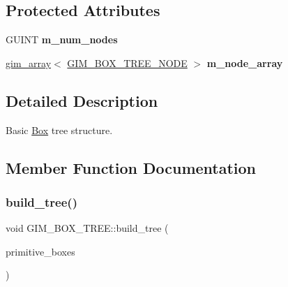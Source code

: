 \subsection*{Protected Attributes}
\begin{DoxyCompactItemize}
\item 
\mbox{\label{classGIM__BOX__TREE_ad175db1b709c3fd9835ce8423af847fd}} 
G\+U\+I\+NT {\bfseries m\+\_\+num\+\_\+nodes}
\item 
\mbox{\label{classGIM__BOX__TREE_aa84656941e890a11505d8c3cd3fc2f99}} 
\hyperlink{classgim__array}{gim\+\_\+array}$<$ \hyperlink{structGIM__BOX__TREE__NODE}{G\+I\+M\+\_\+\+B\+O\+X\+\_\+\+T\+R\+E\+E\+\_\+\+N\+O\+DE} $>$ {\bfseries m\+\_\+node\+\_\+array}
\end{DoxyCompactItemize}


\subsection{Detailed Description}
Basic \hyperlink{classBox}{Box} tree structure. 

\subsection{Member Function Documentation}
\mbox{\label{classGIM__BOX__TREE_af76fa1d2f5e20c8979120fa72cf7575f}} 
\subsubsection{\texorpdfstring{build\+\_\+tree()}{build\_tree()}\hspace{0.1cm}{\footnotesize\ttfamily [1/2]}}
{\footnotesize\ttfamily void G\+I\+M\+\_\+\+B\+O\+X\+\_\+\+T\+R\+E\+E\+::build\+\_\+tree (\begin{DoxyParamCaption}\item[{\hyperlink{classgim__array}{gim\+\_\+array}$<$ \hyperlink{structGIM__AABB__DATA}{G\+I\+M\+\_\+\+A\+A\+B\+B\+\_\+\+D\+A\+TA} $>$ \&}]{primitive\+\_\+boxes }\end{DoxyParamCaption})}



